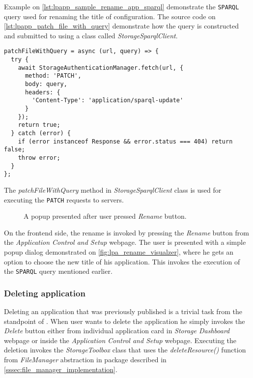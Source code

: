 Example on \autoref{lst:lpapp_sample_rename_app_sparql} demonstrate the \texttt{SPARQL} query used for renaming the title of \lpa{} configuration. The source code on \autoref{lst:lpapp_patch_file_with_query} demonstrate how the query is constructed and submitted to \solid{} using a class called \textit{StorageSparqlClient}.

\begin{listing}[H]    
\begin{verbatim}
patchFileWithQuery = async (url, query) => {
  try {
    await StorageAuthenticationManager.fetch(url, {
      method: 'PATCH',
      body: query,
      headers: {
        'Content-Type': 'application/sparql-update'
      }
    });
    return true;
  } catch (error) {
    if (error instanceof Response && error.status === 404) return false;
    throw error;
  }
};
\end{verbatim}
\caption{The \textit{patchFileWithQuery} method in \textit{StorageSparqlClient} class is used for executing the \texttt{PATCH} requests to \solid{} servers.} 
\label{lst:lpapp_patch_file_with_query}
\end{listing}

\begin{figure}[h]
\centering
{}
\caption{A popup presented after user pressed \textit{Rename} button.}
\label{fig:lpa_rename_visualzer}
\end{figure}

On the frontend side, the rename is invoked by pressing the \textit{Rename} button from the \textit{Application Control and Setup} webpage. The user is presented with a simple popup dialog demonstrated on \autoref{fig:lpa_rename_visualzer}, where he gets an option to choose the new title of his application. This invokes the execution of the \texttt{SPARQL} query mentioned earlier.

\subsubsection{Deleting application}

Deleting an application that was previously published is a trivial task from the standpoint of \lpas{}. When user wants to delete the application he simply invokes the \textit{Delete} button either from individual application card in \textit{Storage Dashboard} webpage or inside the \textit{Application Control and Setup} webpage. Executing the deletion invokes the \textit{StorageToolbox} class that uses the \textit{deleteResource()} function from \textit{FileManager} abstraction in \lpas{} package described in \autoref{sssec:file_manager_implementation}.

